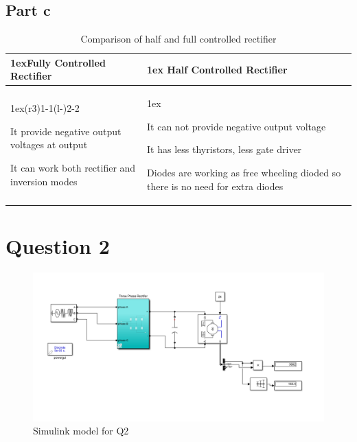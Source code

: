 \documentclass[fleqn, a4paper]{report}
\begin{document}
\subsection*{Part c}
\begin{table}[H]
\begin{tabularx}{\linewidth}{>{\parskip1ex}X@{\kern4\tabcolsep}>{\parskip1ex}X}
\toprule
\hfil\bfseries Fully Controlled Rectifier
&
\hfil\bfseries Half Controlled Rectifier
\\\cmidrule(r{3\tabcolsep}){1-1}\cmidrule(l{-\tabcolsep}){2-2}

It provide negative output voltages at output\par

It can work both rectifier and inversion modes\par

&

It can not provide negative output voltage\par
It has less thyristors, less gate driver \par
Diodes are working as free wheeling dioded so there is no need for extra diodes

\\\bottomrule
\end{tabularx}
\caption{Comparison of half and full controlled rectifier}
\end{table}
\section*{Question 2}
\begin{figure}[H]
    \centering
    \includegraphics[width=13cm]{simulinkpart2.PNG}
    \caption{Simulink model for Q2}
    \label{fig:my_label}
\end{figure}
\end{document}
